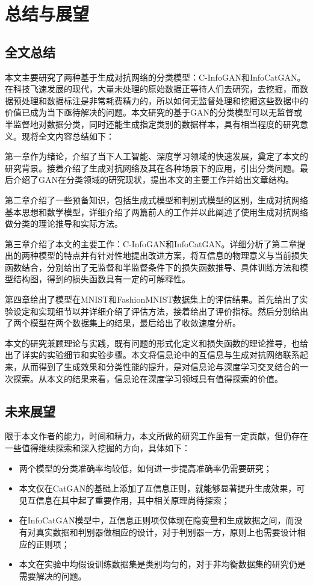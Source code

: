 \chapter{总结与展望}\label{chap:summ}

\section{全文总结}
本文主要研究了两种基于生成对抗网络的分类模型：C-InfoGAN和InfoCatGAN。在科技飞速发展的现代，大量未处理的原始数据正等待人们去研究，去挖掘，而数据预处理和数据标注是非常耗费精力的，所以如何无监督处理和挖掘这些数据中的价值已成为当下亟待解决的问题。本文研究的基于GAN的分类模型可以无监督或半监督地对数据分类，同时还能生成指定类别的数据样本，具有相当程度的研究意义。现将全文内容总结如下：

第一章作为绪论，介绍了当下人工智能、深度学习领域的快速发展，奠定了本文的研究背景。接着介绍了生成对抗网络及其在各种场景下的应用，引出分类问题。最后介绍了GAN在分类领域的研究现状，提出本文的主要工作并给出文章结构。

第二章介绍了一些预备知识，包括生成式模型和判别式模型的区别，生成对抗网络基本思想和数学模型，详细介绍了两篇前人的工作并以此阐述了使用生成对抗网络做分类的理论推导和实际方法。

第三章介绍了本文的主要工作：C-InfoGAN和InfoCatGAN。详细分析了第二章提出的两种模型的特点并有针对性地提出改进方案，将互信息的物理意义与当前损失函数结合，分别给出了无监督和半监督条件下的损失函数推导、具体训练方法和模型结构图，得到的损失函数具有一定的可解释性。

第四章给出了模型在MNIST和FashionMNIST数据集上的评估结果。首先给出了实验设定和实现细节以并详细介绍了评估方法，接着给出了评价指标。然后分别给出了两个模型在两个数据集上的结果，最后给出了收敛速度分析。

本文的研究兼顾理论与实践，既有问题的形式化定义和损失函数的理论推导，也给出了详实的实验细节和实验步骤。本文将信息论中的互信息与生成对抗网络联系起来，从而得到了生成效果和分类性能的提升，是对信息论与深度学习交叉结合的一次探索。从本文的结果来看，信息论在深度学习领域具有值得探索的价值。

\section{未来展望}

限于本文作者的能力，时间和精力，本文所做的研究工作虽有一定贡献，但仍存在一些值得继续探索和深入挖掘的方向，具体如下：
\begin{itemize}
  \item 两个模型的分类准确率均较低，如何进一步提高准确率仍需要研究；
  \item 本文仅在CatGAN的基础上添加了互信息正则，就能够显著提升生成效果，可见互信息在其中起了重要作用，其中相关原理尚待探索；
  \item 在InfoCatGAN模型中，互信息正则项仅体现在隐变量和生成数据之间，而没有对真实数据和判别器做相应的设计，对于判别器一方，原则上也需要设计相应的正则项；
  \item 本文在实验中均假设训练数据集是类别均匀的，对于非均衡数据集的研究仍是需要解决的问题。
\end{itemize}